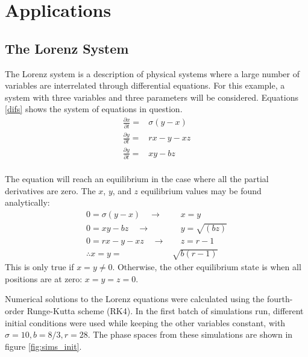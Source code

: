 \documentclass[twocolumn]{article}
\begin{document}
\section{Applications}

\subsection{The Lorenz System}
The Lorenz system is a description of physical systems where a large number of variables are interrelated through differential equations. For this example, a system with three variables and three parameters will be considered. Equations \ref{difs} shows the system of equations in question.
\begin{equation} \label{difs}
\begin{split}
\frac{\partial x}{\partial t} =& \sigma (y - x) \\
\frac{\partial y}{\partial t} =& rx - y - xz \\
\frac{\partial y}{\partial t} =& xy - bz \\
\end{split}
\end{equation}

The equation will reach an equilibrium in the case where all the partial derivatives are zero. The $x$, $y$, and $z$ equilibrium values may be found analytically:
\begin{equation} \label{equilibrium}
\begin{split}
0 = \sigma (y - x) \quad \to  & \quad x = y\\
0 = xy - bz \quad \to & \quad y = \sqrt{(bz)}\\
0 = rx - y - xz \quad \to & \quad z = r-1\\
\therefore x = y =& \sqrt{b(r-1)}
\end{split}
\end{equation}
This is only true if $x = y \neq 0$. Otherwise, the other equilibrium state is
when all positions are at zero: $x = y = z = 0$.

Numerical solutions to the Lorenz equations were calculated using the
fourth-order Runge-Kutta scheme (RK4). In the first batch of simulations run,
different initial conditions were used while keeping the other variables
constant, with $\sigma = 10, b = 8/3, r = 28$. The phase spaces from these
simulations are shown in figure \ref{fig:sims_init}.
\end{document}
